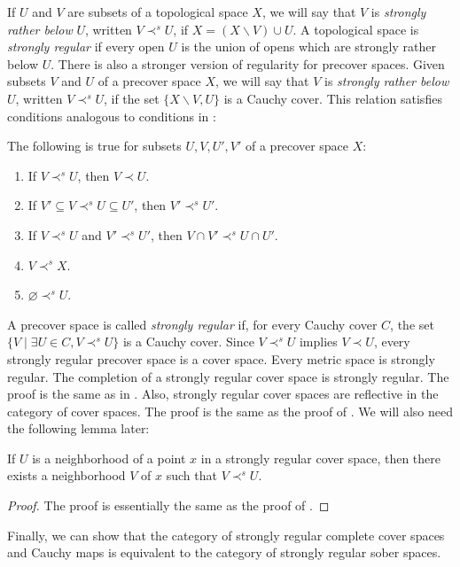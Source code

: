 \documentclass[reqno]{amsart}
\theoremstyle{definition}
\theoremstyle{remark}
\numberwithin{figure}{section}
\newcommand{\rb}{\prec}
\begin{document}
If $U$ and $V$ are subsets of a topological space $X$, we will say that $V$ is \emph{strongly rather below} $U$, written $V \rb^s U$, if $X = (X \backslash V) \cup U$.
A topological space is \emph{strongly regular} if every open $U$ is the union of opens which are strongly rather below $U$.
There is also a stronger version of regularity for precover spaces.
Given subsets $V$ and $U$ of a precover space $X$, we will say that $V$ is \emph{strongly rather below} $U$, written $V \rb^s U$, if the set $\{ X \backslash V, U \}$ is a Cauchy cover.
This relation satisfies conditions analogous to conditions in :

\begin{prop}
The following is true for subsets $U,V,U',V'$ of a precover space $X$:
\begin{enumerate}
\item If $V \rb^s U$, then $V \rb U$.
\item If $V' \subseteq V \rb^s U \subseteq U'$, then $V' \rb^s U'$.
\item If $V \rb^s U$ and $V' \rb^s U'$, then $V \cap V' \rb^s U \cap U'$.
\item $V \rb^s X$.
\item $\varnothing \rb^s U$.
\end{enumerate}
\end{prop}

A precover space is called \emph{strongly regular} if, for every Cauchy cover $C$, the set $\{ V \mid \exists U \in C, V \rb^s U \}$ is a Cauchy cover.
Since $V \rb^s U$ implies $V \rb U$, every strongly regular precover space is a cover space.
Every metric space is strongly regular.
The completion of a strongly regular cover space is strongly regular.
The proof is the same as in .
Also, strongly regular cover spaces are reflective in the category of cover spaces.
The proof is the same as the proof of .
We will also need the following lemma later:

\begin{lem}
If $U$ is a neighborhood of a point $x$ in a strongly regular cover space, then there exists a neighborhood $V$ of $x$ such that $V \rb^s U$.
\end{lem}
\begin{proof}
The proof is essentially the same as the proof of .
\end{proof}

Finally, we can show that the category of strongly regular complete cover spaces and Cauchy maps is equivalent to the category of strongly regular sober spaces.
\end{document}
